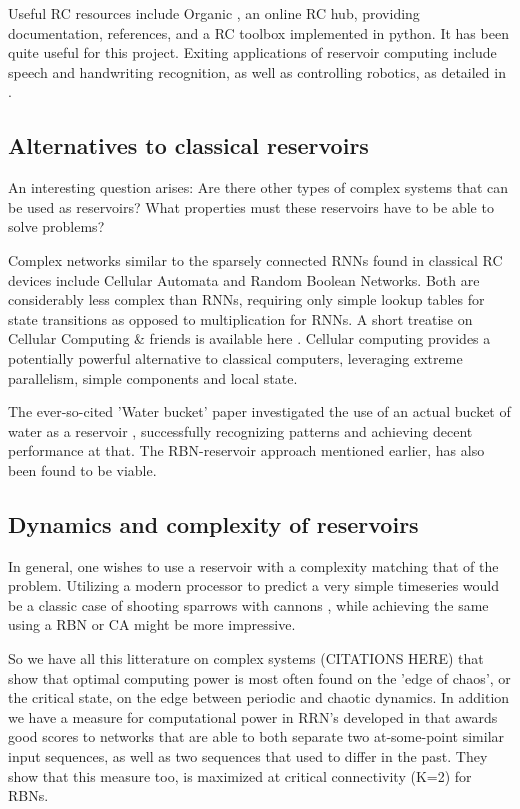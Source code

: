 Useful RC resources include Organic \cite{organic}, an online RC hub,
providing documentation, references, and a RC toolbox implemented in python.
It has been quite useful for this project.
Exiting applications of reservoir computing include speech and handwriting recognition,
as well as controlling robotics, as detailed in \cite{lukovsevivcius2012reservoir}.

\subsection{Alternatives to classical reservoirs}

An interesting question arises:
Are there other types of complex systems that can be used as reservoirs?
What properties must these reservoirs have to be able to solve problems?

Complex networks similar to the sparsely connected RNNs found in classical RC devices include Cellular Automata and Random Boolean Networks.
Both are considerably less complex than RNNs, requiring only simple lookup tables for state transitions as opposed to multiplication for RNNs.
A short treatise on Cellular Computing \& friends is available here \cite{sipper1999emergence}.
Cellular computing provides a potentially powerful alternative to classical computers,
leveraging extreme parallelism, simple components and local state.

The ever-so-cited 'Water bucket' paper investigated the use of an actual bucket of water as a reservoir \cite{fernando2003pattern},
successfully recognizing patterns and achieving decent performance at that.
The RBN-reservoir \cite{rbn-reservoir} approach mentioned earlier, has also been found to be viable.

\subsection{Dynamics and complexity of reservoirs}

In general, one wishes to use a reservoir with a complexity matching that of the problem.
Utilizing a modern processor to predict a very simple timeseries would be a classic case of shooting sparrows with cannons \cite{wiki:sparrow},
while achieving the same using a RBN or CA might be more impressive.


So we have all this litterature on complex systems (CITATIONS HERE) that show that optimal computing power is most often found on the 'edge of chaos', or the critical state, on the edge between periodic and chaotic dynamics.
In addition we have a measure for computational power in RRN's developed in \cite{rbn-reservoir} that awards good scores to networks that are able to both separate two at-some-point similar input sequences, as well as two sequences that used to differ in the past.
They show that this measure too, is maximized at critical connectivity (K=2) for RBNs.


